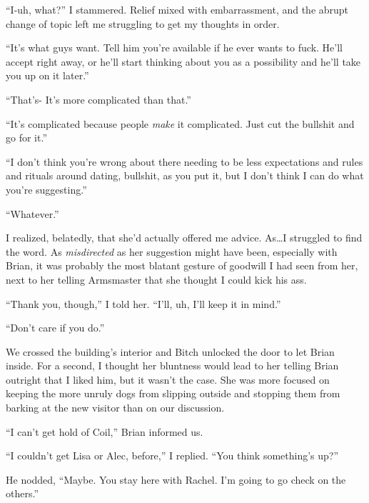 ``I-uh, what?'' I stammered.  Relief mixed with embarrassment, and the abrupt change of topic left me struggling to get my thoughts in order.



``It's what guys want.  Tell him you're available if he ever wants to fuck.  He'll accept right away, or he'll start thinking about you as a possibility and he'll take you up on it later.''



``That's-  It's more complicated than that.''



``It's complicated because people \emph{make }it complicated.  Just cut the bullshit and go for it.''



``I don't think you're wrong about there needing to be less expectations and rules and rituals around dating, bullshit, as you put it, but I don't think I can do what you're suggesting.''



``Whatever.''



I realized, belatedly, that she'd actually offered me advice.  As\ldots I struggled to find the word.  As \emph{misdirected} as her suggestion might have been, especially with Brian, it was probably the most blatant gesture of goodwill I had seen from her, next to her telling Armsmaster that she thought I could kick his ass.



``Thank you, though,'' I told her.  ``I'll, uh, I'll keep it in mind.''



``Don't care if you do.''



We crossed the building's interior and Bitch unlocked the door to let Brian inside.  For a second, I thought her bluntness would lead to her telling Brian outright that I liked him, but it wasn't the case.  She was more focused on keeping the more unruly dogs from slipping outside and stopping them from barking at the new visitor than on our discussion.



``I can't get hold of Coil,'' Brian informed us.



``I couldn't get Lisa or Alec, before,'' I replied.  ``You think something's up?''



He nodded, ``Maybe.  You stay here with Rachel.  I'm going to go check on the others.''



